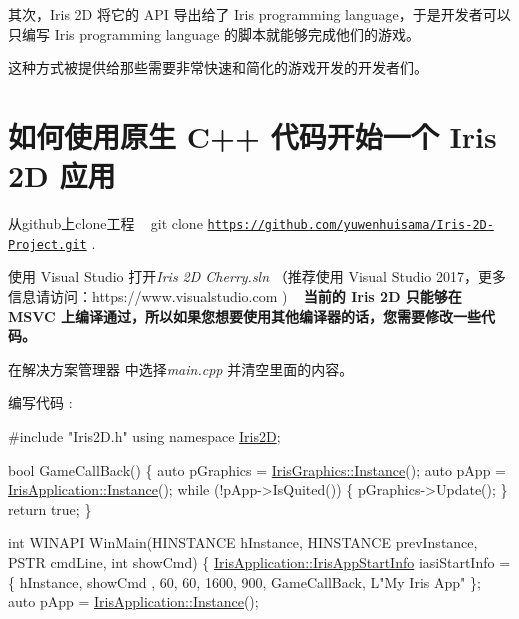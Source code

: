 \begin{DoxyParagraph}{}
其次，\+Iris 2D 将它的 A\+PI 导出给了 Iris programming language，于是开发者可以只编写 Iris programming language 的脚本就能够完成他们的游戏。 
\end{DoxyParagraph}
\begin{DoxyParagraph}{}
这种方式被提供给那些需要非常快速和简化的游戏开发的开发者们。 
\end{DoxyParagraph}
\hypertarget{index_install_sec_1}{}\section{如何使用原生 C++ 代码开始一个 Iris 2\+D 应用}\label{index_install_sec_1}
\begin{DoxyItemize}
\item 从github上clone工程 ~\newline
 {\ttfamily  git clone \href{https://github.com/yuwenhuisama/Iris-2D-Project.git}{\tt https\+://github.\+com/yuwenhuisama/\+Iris-\/2\+D-\/\+Project.\+git} }. \item 使用 Visual Studio 打开{\itshape  Iris 2D Cherry.\+sln }（推荐使用 Visual Studio 2017，更多信息请访问：https\+://www.visualstudio.\+com ) ~\newline
 {\bfseries  当前的 Iris 2D 只能够在 M\+S\+VC 上编译通过，所以如果您想要使用其他编译器的话，您需要修改一些代码。} \item 在{\ttfamily  解决方案管理器 } 中选择{\itshape  main.\+cpp }并清空里面的内容。 \item 编写代码 \+: 
\begin{DoxyCode}
\textcolor{preprocessor}{#include "Iris2D.h"}
\textcolor{keyword}{using namespace }\hyperlink{namespace_iris2_d}{Iris2D};

\textcolor{keywordtype}{bool} GameCallBack() \{
    \textcolor{keyword}{auto} pGraphics = \hyperlink{class_iris2_d_1_1_iris_graphics_a25533fd69478336d60c5b1f639802d3a}{IrisGraphics::Instance}();
    \textcolor{keyword}{auto} pApp = \hyperlink{class_iris2_d_1_1_iris_application_ab2a9826c10d90732f398859782817f8e}{IrisApplication::Instance}();
    \textcolor{keywordflow}{while} (!pApp->IsQuited()) \{
      pGraphics->Update();
    \}
    \textcolor{keywordflow}{return} \textcolor{keyword}{true};
\}

\textcolor{keywordtype}{int} WINAPI WinMain(HINSTANCE hInstance, HINSTANCE prevInstance, PSTR cmdLine, \textcolor{keywordtype}{int} showCmd) \{
    \hyperlink{struct_iris2_d_1_1_iris_application_1_1_iris_app_start_info}{IrisApplication::IrisAppStartInfo} iasiStartInfo = \{ hInstance, showCmd
      , 60, 60, 1600, 900, GameCallBack, L\textcolor{stringliteral}{"My Iris App"} \};
    \textcolor{keyword}{auto} pApp = \hyperlink{class_iris2_d_1_1_iris_application_ab2a9826c10d90732f398859782817f8e}{IrisApplication::Instance}(); 


\end{DoxyCode}
\end{DoxyItemize}
